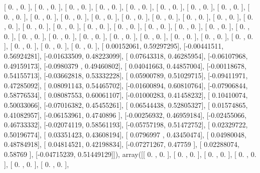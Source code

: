 \documentclass{article}
\begin{document}
       [ 0.        ,  0.        ],
       [ 0.        ,  0.        ],
       [ 0.        ,  0.        ],
       [ 0.        ,  0.        ],
       [ 0.        ,  0.        ],
       [ 0.        ,  0.        ],
       [ 0.        ,  0.        ],
       [ 0.        ,  0.        ],
       [ 0.        ,  0.        ],
       [ 0.        ,  0.        ],
       [ 0.        ,  0.        ],
       [ 0.        ,  0.        ],
       [ 0.        ,  0.        ],
       [ 0.        ,  0.        ],
       [ 0.        ,  0.        ],
       [ 0.        ,  0.        ],
       [ 0.        ,  0.        ],
       [ 0.        ,  0.        ],
       [ 0.        ,  0.        ],
       [ 0.        ,  0.        ],
       [ 0.        ,  0.        ],
       [ 0.        ,  0.        ],
       [ 0.        ,  0.        ],
       [ 0.        ,  0.        ],
       [ 0.        ,  0.        ],
       [ 0.        ,  0.        ],
       [ 0.        ,  0.        ],
       [ 0.        ,  0.        ],
       [ 0.        ,  0.        ],
       [ 0.        ,  0.        ],
       [ 0.        ,  0.        ],
       [ 0.        ,  0.        ],
       [ 0.        ,  0.        ],
       [ 0.        ,  0.        ],
       [ 0.        ,  0.        ],
       [ 0.        ,  0.        ],
       [ 0.00152061,  0.59297295],
       [-0.00441511,  0.56924281],
       [-0.01633509,  0.48223099],
       [ 0.07643318,  0.46285954],
       [-0.06107968,  0.49159173],
       [-0.0980379 ,  0.49460802],
       [ 0.04041663,  0.44857004],
       [-0.00118678,  0.54155713],
       [-0.03662818,  0.53332228],
       [ 0.05900789,  0.51029715],
       [-0.09411971,  0.47285092],
       [ 0.08091143,  0.54465702],
       [-0.01600894,  0.60810764],
       [-0.07906844,  0.58776534],
       [ 0.08087553,  0.60061107],
       [-0.01000283,  0.41458232],
       [ 0.10410074,  0.50033066],
       [-0.07016382,  0.45455261],
       [ 0.06544438,  0.52805327],
       [ 0.01574865,  0.41082957],
       [-0.06153961,  0.4740896 ],
       [-0.00256932,  0.46959184],
       [-0.02455066,  0.46733332],
       [-0.02074119,  0.58561193],
       [-0.05757198,  0.51472752],
       [ 0.02329722,  0.50196774],
       [ 0.03351423,  0.43608194],
       [ 0.0796997 ,  0.43450474],
       [ 0.04980048,  0.48784918],
       [ 0.04814521,  0.42198834],
       [-0.07271267,  0.47759   ],
       [ 0.02288074,  0.58769   ],
       [-0.04715239,  0.51449129]]), array([[ 0.        ,  0.        ],
       [ 0.        ,  0.        ],
       [ 0.        ,  0.        ],
       [ 0.        ,  0.        ],
       [ 0.        ,  0.        ],
       [ 0.        ,  0.        ],
\end{document}
